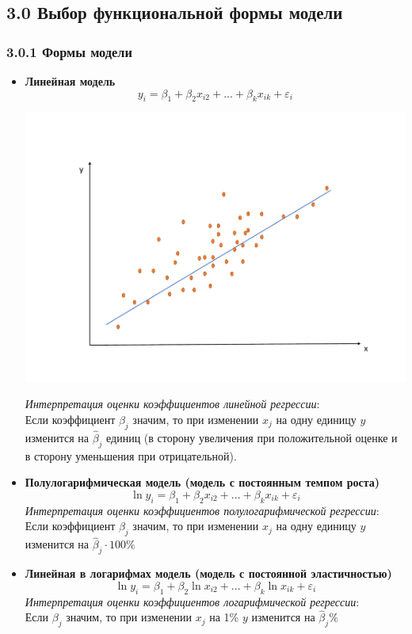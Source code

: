 \documentclass[a0,final]{a0poster}
\begin{document}
\begin{multicols}{4}
\section*{3.0 Выбор функциональной формы модели}
\subsubsection*{3.0.1 Формы модели}
\begin{itemize}
\item \textbf{Линейная модель}
\[y_i = \beta_1 + \beta_2x_{i2}+...+\beta_{k}x_{ik}+\varepsilon_i\]
\begin{center}
    \includegraphics[width=0.2\paperwidth]{linear.pdf}
\end{center}

\textit{Интерпретация оценки коэффициентов линейной регрессии}:\\
Если коэффициент $\beta_j$ значим, то при изменении $x_j$ на одну единицу $y$ изменится на $\hat{\beta}_j$ единиц (в сторону увеличения при положительной оценке и в сторону уменьшения при отрицательной). \\
\item \textbf{Полулогарифмическая модель (модель с постоянным темпом роста)}
\[\ln{y_i} = \beta_1 + \beta_2x_{i2}+...+\beta_kx_{ik}+\varepsilon_i\]
\textit{Интерпретация оценки коэффициентов полулогарифмической регрессии}:
Если коэффициент $\beta_j$ значим, то при изменении $x_j$ на одну единицу $y$ изменится на $\hat{\beta}_j\cdot 100\%$ \\
\item \textbf{Линейная в логарифмах модель (модель с постоянной эластичностью)}
\[\ln{y_i} = \beta_1 + \beta_2\ln{x_{i2}}+...+\beta_k\ln{x_{ik}}+\varepsilon_i\]
\textit{Интерпретация оценки коэффициентов логарифмической регрессии}:\\
Если $\beta_j$ значим, то при изменении $x_j$ на 1\%  $y$ изменится на $\hat{\beta}_j\%$
\end{itemize}

\end{multicols}
\end{document}
